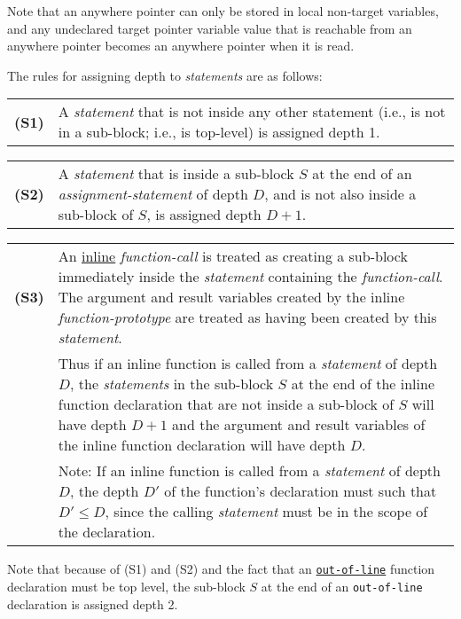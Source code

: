 \documentclass[12pt]{article}
\newcommand{\key}[1]{{\rm \bfseries #1}}
\newenvironment{indpar}[1][0.3in]%
	{\begin{list}{}%
		     {\setlength{\itemsep}{0in}%
		      \setlength{\topsep}{0in}%
		      \setlength{\parsep}{1ex}%
		      \setlength{\labelwidth}{#1}%
		      \setlength{\leftmargin}{#1}%
		      \addtolength{\leftmargin}{\labelsep}}%
	 \item}%
	{\end{list}}
\begin{document}
Note that an anywhere pointer can only be stored in local non-target
variables, and any undeclared target pointer variable value
that is reachable from
an anywhere pointer becomes an anywhere pointer when it is read.

The rules for assigning depth to {\em statements} are as follows:
\begin{indpar}[0.2in]
\begin{tabular}{p{0.4in}p{5.0in}}
\key{(S1)}	& A {\em statement} that is not inside any other statement
                  (i.e., is not in a sub-block; i.e., is top-level)
		  is assigned depth 1.
\end{tabular}

\begin{tabular}{p{0.4in}p{5.0in}}
\key{(S2)}	& A {\em statement} that is inside a sub-block $S$ at the end
                  of an {\em assignment-statement} of depth $D$, and
		  is not also
		  inside a sub-block of $S$, is assigned depth $D+1$.
\end{tabular}

\begin{tabular}{p{0.4in}p{5.0in}}
\key{(S3)}	& An \underline{inline} {\em function-call} is treated
                  as creating a sub-block immediately inside
		  the {\em statement} containing the {\em function-call}.
		  The argument and result variables created by the inline
		  {\em function-prototype} are treated as having been
		  created by this {\em statement}.
\\[1ex]
		& Thus if an inline function is called from a {\em statement}
		  of depth $D$, the {\em statements} in the sub-block $S$ at the
		  end of the inline function declaration that are not inside
		  a sub-block of $S$ will have depth $D+1$ and the
		  argument and result variables of the inline function
		  declaration will have depth $D$.
\\[1ex]
		& Note: If an inline function is called from a {\em statement}
		  of depth $D$, the depth $D'$ of the function's declaration
		  must such that $D'\leq D$, since the calling {\em statement}
		  must be in the scope of the declaration.
\end{tabular}
\end{indpar}

Note that because of (S1) and (S2) and the fact that an
\underline{\tt out-of-line} function declaration must be top level,
the sub-block $S$ at the end of an {\tt out-of-line}
declaration is assigned depth 2.
\end{document}
